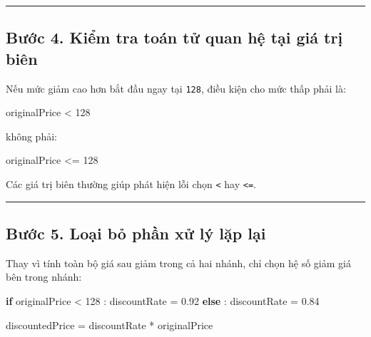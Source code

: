 \documentclass[
  11pt,
  a4paper,
]{article}
\newenvironment{Shaded}{}{}
\newcommand{\ControlFlowTok}[1]{\textcolor[rgb]{0.00,0.44,0.13}{\textbf{#1}}}
\newcommand{\DecValTok}[1]{\textcolor[rgb]{0.25,0.63,0.44}{#1}}
\newcommand{\FloatTok}[1]{\textcolor[rgb]{0.25,0.63,0.44}{#1}}
\newcommand{\NormalTok}[1]{#1}
\newcommand{\OperatorTok}[1]{\textcolor[rgb]{0.40,0.40,0.40}{#1}}
\begin{document}
\begin{center}\rule{0.5\linewidth}{0.5pt}\end{center}

\subsection{Bước 4. Kiểm tra toán tử quan hệ tại giá trị
biên}\label{bux1b0ux1edbc-4.-kiux1ec3m-tra-touxe1n-tux1eed-quan-hux1ec7-tux1ea1i-giuxe1-trux1ecb-biuxean}

Nếu mức giảm cao hơn bắt đầu ngay tại \texttt{128}, điều kiện cho mức
thấp phải là:

\begin{Shaded}
\begin{Highlighting}[]
\NormalTok{originalPrice }\OperatorTok{\textless{}} \DecValTok{128}
\end{Highlighting}
\end{Shaded}

không phải:

\begin{Shaded}
\begin{Highlighting}[]
\NormalTok{originalPrice }\OperatorTok{\textless{}=} \DecValTok{128}
\end{Highlighting}
\end{Shaded}

Các giá trị biên thường giúp phát hiện lỗi chọn \texttt{\textless{}} hay
\texttt{\textless{}=}.

\begin{center}\rule{0.5\linewidth}{0.5pt}\end{center}

\subsection{Bước 5. Loại bỏ phần xử lý lặp
lại}\label{bux1b0ux1edbc-5.-loux1ea1i-bux1ecf-phux1ea7n-xux1eed-luxfd-lux1eb7p-lux1ea1i}

Thay vì tính toàn bộ giá sau giảm trong cả hai nhánh, chỉ chọn hệ số
giảm giá bên trong nhánh:

\begin{Shaded}
\begin{Highlighting}[]
\ControlFlowTok{if}\NormalTok{ originalPrice }\OperatorTok{\textless{}} \DecValTok{128}\NormalTok{ :}
\NormalTok{    discountRate }\OperatorTok{=} \FloatTok{0.92}
\ControlFlowTok{else}\NormalTok{ :}
\NormalTok{    discountRate }\OperatorTok{=} \FloatTok{0.84}

\NormalTok{discountedPrice }\OperatorTok{=}\NormalTok{ discountRate }\OperatorTok{*}\NormalTok{ originalPrice}
\end{Highlighting}
\end{Shaded}
\end{document}
